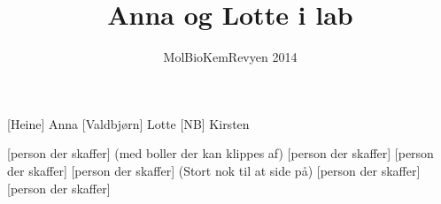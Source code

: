 \documentclass[a4paper,11pt]{article}
\title{Anna og Lotte i lab}
\author{MolBioKemRevyen 2014}
\begin{document}
\maketitle

\begin{roles}
    [Heine] Anna
    [Valdbjørn] Lotte
    [NB] Kirsten
\end{roles}

\begin{props}
    [person der skaffer] (med boller der kan klippes af)
    [person der skaffer]
    [person der skaffer]
    [person der skaffer] (Stort nok til at side på)
    [person der skaffer]
    [person der skaffer]
\end{props}
\end{document}
